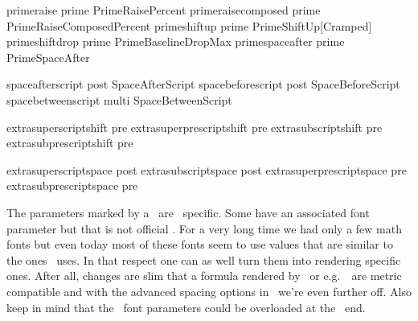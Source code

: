 \NC \llap{\star\space}primeraise                    \NC prime  \NC PrimeRaisePercent                   \NC                     \NC \NR
\NC \llap{\star\space}primeraisecomposed            \NC prime  \NC PrimeRaiseComposedPercent           \NC                     \NC \NR
\NC \llap{\star\space}primeshiftup                  \NC prime  \NC PrimeShiftUp[Cramped]               \NC                     \NC \NR
\NC \llap{\star\space}primeshiftdrop                \NC prime  \NC PrimeBaselineDropMax                \NC                     \NC \NR
\NC \llap{\star\space}primespaceafter               \NC prime  \NC PrimeSpaceAfter                     \NC                     \NC \NR

\NC                   spaceafterscript              \NC post   \NC SpaceAfterScript                    \NC \typ {\scriptspace} \NC \NR
\NC \llap{\star\space}spacebeforescript             \NC post   \NC SpaceBeforeScript                   \NC                     \NC \NR
\NC \llap{\star\space}spacebetweenscript            \NC multi  \NC SpaceBetweenScript                  \NC                     \NC \NR

\NC \llap{\star\space}extrasuperscriptshift         \NC pre    \NC                                     \NC                     \NC \NR
\NC \llap{\star\space}extrasuperprescriptshift      \NC pre    \NC                                     \NC                     \NC \NR
\NC \llap{\star\space}extrasubscriptshift           \NC pre    \NC                                     \NC                     \NC \NR
\NC \llap{\star\space}extrasubprescriptshift        \NC pre    \NC                                     \NC                     \NC \NR

\NC \llap{\star\space}extrasuperscriptspace         \NC post   \NC                                     \NC                     \NC \NR
\NC \llap{\star\space}extrasubscriptspace           \NC post   \NC                                     \NC                     \NC \NR
\NC \llap{\star\space}extrasuperprescriptspace      \NC pre    \NC                                     \NC                     \NC \NR
\NC \llap{\star\space}extrasubprescriptspace        \NC pre    \NC                                     \NC                     \NC \NR
\LL
\stoptabulate

The parameters marked by a \star\ are \LUAMETATEX\ specific. Some have an
associated font parameter but that is not official \OPENTYPE. For a very long
time we had only a few math fonts but even today most of these fonts seem to
use values that are similar to the ones \TEX\ uses. In that respect one can
as well turn them into rendering specific ones. After all, changes are slim that
a formula rendered by \TEX\ or e.g.\ \MSWORD\ are metric compatible and with
the advanced spacing options in \LUAMETATEX\ we're even further off. Also keep
in mind that the \TEX\ font parameters could be overloaded at the \TEX\ end.

